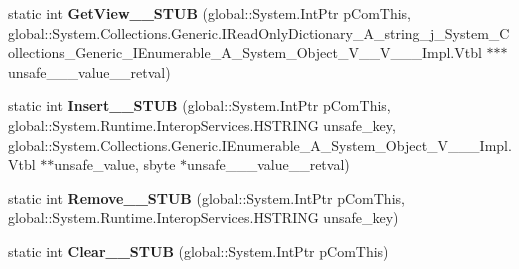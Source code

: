 \begin{DoxyCompactItemize}
static int {\bfseries Get\+View\+\_\+\+\_\+\+S\+T\+UB} (global\+::\+System.\+Int\+Ptr p\+Com\+This, global\+::\+System.\+Collections.\+Generic.\+I\+Read\+Only\+Dictionary\+\_\+\+A\+\_\+string\+\_\+j\+\_\+\+System\+\_\+\+Collections\+\_\+\+Generic\+\_\+\+I\+Enumerable\+\_\+\+A\+\_\+\+System\+\_\+\+Object\+\_\+\+V\+\_\+\+\_\+\+V\+\_\+\+\_\+\+\_\+\+Impl.\+Vtbl $\ast$$\ast$$\ast$unsafe\+\_\+\+\_\+\+\_\+value\+\_\+\+\_\+retval)
\item 
\mbox{\label{struct_system_1_1_collections_1_1_generic_1_1_i_dictionary___a__string__j___system___collectionsedc27740e4e948ffc8828d48179ed85a_a778408d04ad40a4e8d48ddc8dfc26d16}} 
static int {\bfseries Insert\+\_\+\+\_\+\+S\+T\+UB} (global\+::\+System.\+Int\+Ptr p\+Com\+This, global\+::\+System.\+Runtime.\+Interop\+Services.\+H\+S\+T\+R\+I\+NG unsafe\+\_\+key, global\+::\+System.\+Collections.\+Generic.\+I\+Enumerable\+\_\+\+A\+\_\+\+System\+\_\+\+Object\+\_\+\+V\+\_\+\+\_\+\+\_\+\+Impl.\+Vtbl $\ast$$\ast$unsafe\+\_\+value, sbyte $\ast$unsafe\+\_\+\+\_\+\+\_\+value\+\_\+\+\_\+retval)
\item 
\mbox{\label{struct_system_1_1_collections_1_1_generic_1_1_i_dictionary___a__string__j___system___collectionsedc27740e4e948ffc8828d48179ed85a_a2c8421cc4dc71f6a9ae0f30c1c9616cc}} 
static int {\bfseries Remove\+\_\+\+\_\+\+S\+T\+UB} (global\+::\+System.\+Int\+Ptr p\+Com\+This, global\+::\+System.\+Runtime.\+Interop\+Services.\+H\+S\+T\+R\+I\+NG unsafe\+\_\+key)
\item 
\mbox{\label{struct_system_1_1_collections_1_1_generic_1_1_i_dictionary___a__string__j___system___collectionsedc27740e4e948ffc8828d48179ed85a_a7076ea31282be45c7c312e1ee2c6e6b3}} 
static int {\bfseries Clear\+\_\+\+\_\+\+S\+T\+UB} (global\+::\+System.\+Int\+Ptr p\+Com\+This)
\item 
\mbox{\label{struct_system_1_1_collections_1_1_generic_1_1_i_dictionary___a__string__j___system___collectionsedc27740e4e948ffc8828d48179ed85a_a5599d7b6dbfa547f31e442c88263bc27}} 
$$
\end{DoxyCompactItemize}
